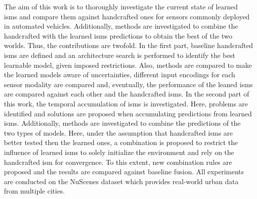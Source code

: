 The aim of this work is to thoroughly investigate the current state of learned \gls{ism}s and compare them against handcrafted ones for sensors commonly deployed in automated vehicles. Additionally, methods are investigated to combine the handcrafted with the learned \gls{ism}s predictions to obtain the best of the two worlds. Thus, the contributions are twofold. In the first part, baseline handcrafted \gls{ism}s are defined and an architecture search is performed to identify the best learnable model, given imposed restrictions. Also, methods are compared to make the learned models aware of uncertainties, different input encodings for each sensor modality are compared and, eventually, the performance of the leaned \gls{ism}s are compared against each other and the handcrafted \gls{ism}s. In the second part of this work, the temporal accumulation of \gls{ism}s is investigated. Here, problems are identified and solutions are proposed when accumulating predictions from learned \gls{ism}s. Additionally, methods are investigated to combine the predictions of the two types of models. Here, under the assumption that handcrafted \gls{ism}s are better tested then the learned ones, a combination is proposed to restrict the influence of learned \gls{ism}s to solely initialize the environment and rely on the handcrafted \gls{ism} for convergence. To this extent, new combination rules are proposed and the results are compared against baseline fusion. All experiments are conducted on the NuScenes dataset \cite{caesar2020nuscenes} which provides real-world urban data from multiple cities.
%
